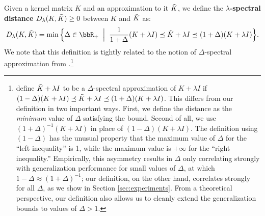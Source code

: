 \begin{definition}
	Given a kernel matrix $K$ and an approximation to it $\tilde{K}$, we define the \textbf{$\lambda$-spectral distance} $D_{\lambda}(K,\tilde{K})\geq 0$ between $K$ and $\tilde{K}$ as:
	$$D_{\lambda}(K,\tK) = \min \Big\{\Delta \in \RR_{+} \;\;\Big|\;\; \frac{1}{1+\Delta}(K+\lambda I) \preceq \tK + \lambda I \preceq (1+\Delta)(K+\lambda I)\Big\}.$$
	We note that this definition is tightly related to the notion of $\Delta$-spectral approximation from \citet{avron17}.\footnote{\citet{avron17} define $\tilde{K}+\lambda I$ to be a $\Delta$-spectral approximation of $K+\lambda I$ if $(1-\Delta)(K+\lambda I) \preceq \tilde{K} + \lambda I \preceq (1+\Delta)(K+\lambda I)$. This differs from our definition in two important ways. First, we define the distance as the \textit{minimum} value of $\Delta$ satisfying the bound.  Second of all, we use $(1+\Delta)^{-1}(K+\lambda I)$ in place of $(1-\Delta)(K+\lambda I)$. The definition using $(1-\Delta)$ has the unusual property that the maximum value of $\Delta$ for the ``left inequality'' is 1, while the maximum value is $+\infty$ for the ``right inequality.'' Empirically, this asymmetry results in $\Delta$ only correlating strongly with generalization performance for small values of $\Delta$, at which $1-\Delta\approx (1+\Delta)^{-1}$; our definition, on the other hand, correlates strongly for all $\Delta$, as we show in Section \ref{sec:experiments}.  From a theoretical perspective, our definition also allows us to cleanly extend the generalization bounds to values of $\Delta > 1$.}
\end{definition}


